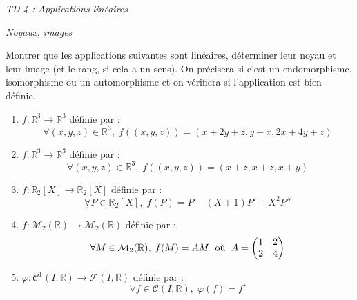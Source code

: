 \documentclass[a4paper,10pt]{report}
\begin{document}
\everymath{\displaystyle}
\begin{center}
\textit{{ {\huge TD 4 : Applications linéaires}}}
\end{center}

\bigskip

\medskip

\begin{center}
\textit{{ {\large Noyaux, images}}}
\end{center}


\begin{Exercice}{} Montrer que les applications suivantes sont linéaires, déterminer leur noyau et leur image (et le rang, si cela a un sens). On précisera si c'est un endomorphisme, isomorphisme ou un automorphisme et on vérifiera si l'application est bien définie.

\begin{enumerate}
\item $f : \mathbb{R}^3 \rightarrow \mathbb{R}^3$ définie par :
$$ \forall (x,y,z) \in \mathbb{R}^3, \; f((x,y,z))= (x+2y+z,y-x,2x+4y+z)$$
\item $f : \mathbb{R}^3 \rightarrow \mathbb{R}^3$ définie par :
$$ \forall (x,y,z) \in \mathbb{R}^3, \; f((x,y,z))= (x+z,x+z,x+y)$$
\item $f : \mathbb{R}_2[X] \rightarrow \mathbb{R}_2[X]$ définie par :
$$ \forall P \in \mathbb{R}_2[X], \; f(P)=P-(X+1)P'+X^2 P''$$
\item $f : \mathcal{M}_2(\mathbb{R}) \rightarrow \mathcal{M}_2(\mathbb{R})$ définie par :
$$ \forall M \in \mathcal{M}_2(\mathbb{R}), \; f(M)=AM \; \hbox{ où } \; A= \begin{pmatrix}
1 & 2 \\
2 & 4 \\
\end{pmatrix} $$
\item $\varphi : \mathcal{C}^1(I, \mathbb{R}) \rightarrow \mathcal{F}(I, \mathbb{R})$ définie par :
$$ \forall f \in \mathcal{C}(I, \mathbb{R}), \; \varphi(f)=f'$$
\end{enumerate}
\end{Exercice}

\corr 
\end{document}
